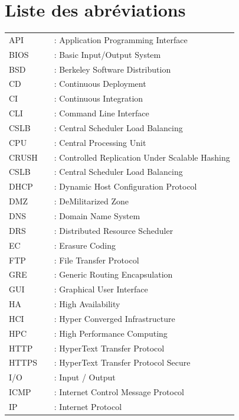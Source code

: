 \chapter*{Liste des abréviations}

\setlength{\LTleft}{0pt}
\setlength{\LTright}{\fill}
\begin{longtable}{lcl}
API  && : Application Programming Interface\\
BIOS && : Basic Input/Output System\\
BSD  && : Berkeley Software Distribution\\
CD   && : Continuous Deployment\\
CI   && : Continuous Integration\\
CLI  && : Command Line Interface\\
CSLB && : Central Scheduler Load Balancing\\
CPU  && : Central Processing Unit\\
CRUSH && : Controlled Replication Under Scalable Hashing\\
CSLB && : Central Scheduler Load Balancing\\
DHCP && : Dynamic Host Configuration Protocol\\
DMZ  && : DeMilitarized Zone\\
DNS  && : Domain Name System\\
DRS  && : Distributed Resource Scheduler\\
EC   && : Erasure Coding\\
FTP  && : File Transfer Protocol\\
GRE  && : Generic Routing Encapsulation\\
GUI  && : Graphical User Interface\\
HA   && : High Availability\\
HCI  && : Hyper Converged Infrastructure\\
HPC  && : High Performance Computing\\
HTTP && : HyperText Transfer Protocol\\
HTTPS && : HyperText Transfer Protocol Secure\\
I/O  && : Input / Output\\
ICMP && : Internet Control Message Protocol\\
IP   && : Internet Protocol\\

\end{longtable}
